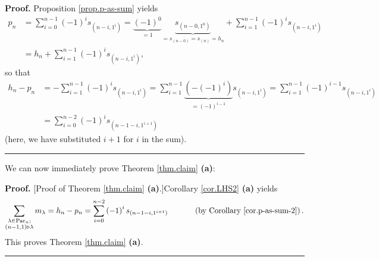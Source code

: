 \documentclass[numbers=enddot,12pt,final,onecolumn,notitlepage]{scrartcl}%
\theoremstyle{definition}
\newenvironment{proof}[1][Proof]{\noindent\textbf{#1.} }{\ \rule{0.5em}{0.5em}}
\let\sumnonlimits\sum
\renewcommand{\sum}{\sumnonlimits\limits}
\begin{document}
\begin{proof}
Proposition \ref{prop.p-as-sum} yields%
\begin{align*}
p_{n}  &  =\sum_{i=0}^{n-1}\left(  -1\right)  ^{i}s_{\left(  n-i,1^{i}\right)
}=\underbrace{\left(  -1\right)  ^{0}}_{=1}\underbrace{s_{\left(
n-0,1^{0}\right)  }}_{=s_{\left(  n-0\right)  }=s_{\left(  n\right)  }=h_{n}%
}+\sum_{i=1}^{n-1}\left(  -1\right)  ^{i}s_{\left(  n-i,1^{i}\right)  }\\
&  =h_{n}+\sum_{i=1}^{n-1}\left(  -1\right)  ^{i}s_{\left(  n-i,1^{i}\right)
},
\end{align*}
so that%
\begin{align*}
h_{n}-p_{n}  &  =-\sum_{i=1}^{n-1}\left(  -1\right)  ^{i}s_{\left(
n-i,1^{i}\right)  }=\sum_{i=1}^{n-1}\underbrace{\left(  -\left(  -1\right)
^{i}\right)  }_{=\left(  -1\right)  ^{i-1}}s_{\left(  n-i,1^{i}\right)  }%
=\sum_{i=1}^{n-1}\left(  -1\right)  ^{i-1}s_{\left(  n-i,1^{i}\right)  }\\
&  =\sum_{i=0}^{n-2}\left(  -1\right)  ^{i}s_{\left(  n-1-i,1^{i+1}\right)  }%
\end{align*}
(here, we have substituted $i+1$ for $i$ in the sum).
\end{proof}

We can now immediately prove Theorem \ref{thm.claim} \textbf{(a)}:

\begin{proof}
[Proof of Theorem \ref{thm.claim} \textbf{(a)}.]Corollary \ref{cor.LHS2}
\textbf{(a)} yields%
\[
\sum_{\substack{\lambda\in\operatorname*{Par}\nolimits_{n};\\\left(
n-1,1\right)  \triangleright\lambda}}m_{\lambda}=h_{n}-p_{n}=\sum_{i=0}%
^{n-2}\left(  -1\right)  ^{i}s_{\left(  n-1-i,1^{i+1}\right)  }%
\ \ \ \ \ \ \ \ \ \ \left(  \text{by Corollary \ref{cor.p-as-sum-2}}\right)
.
\]
This proves Theorem \ref{thm.claim} \textbf{(a)}.
\end{proof}
\end{document}
